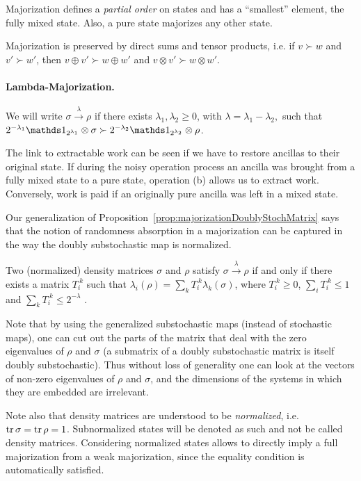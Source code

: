 \documentclass[11pt,a4paper]{article}
\newcommand{\lambdamaj}[1]{\xrightarrow{#1}}
\begin{document}
Majorization defines a {\em partial order} on states and has a ``smallest'' element, the fully mixed state. Also,
a pure state majorizes any other state.

Majorization is preserved by direct sums and tensor products, i.e. if $v\succ w$ and $v'\succ w'$, then
$v\oplus v' \succ w\oplus w'$ and $v\otimes v' \succ w\otimes w'$.

\paragraph{Lambda-Majorization.} We will write $\sigma\lambdamaj{\lambda}\rho$ if there exists
$\lambda_1,\lambda_2\geqslant 0$, with $\lambda=\lambda_1-\lambda_2,$ such
that $2^{-\lambda_1}\Ident_{2^{\lambda_1}}\otimes\sigma \succ 2^{-\lambda_2}\Ident_{2^{\lambda_2}}\otimes\rho$.

The link to extractable work can be seen if we have to restore ancillas to their original state. If during
the noisy operation process an ancilla was brought from a fully mixed state to a pure state, operation (b)
allows us to extract work. Conversely, work is paid if an originally pure ancilla was left in a mixed
state.

Our generalization of Proposition~\ref{prop:majorizationDoublyStochMatrix} says that the notion of
randomness absorption in a majorization can be captured in
the way the doubly substochastic map is normalized.
\begin{prop}
  \label{prop:LambdaMajTik}
  Two (normalized) density matrices $\sigma$ and $\rho$ satisfy $\sigma\lambdamaj{\lambda}\rho$
  if and only if there exists a matrix $T_i^{~k}$ such that $\lambda_i(\rho) = \sum_k T_i^{~k}\lambda_k(\sigma)$,
  where $T_i^{~k}\geqslant 0$, $\sum_i T_i^{~k} \leqslant 1$ and $\sum_k T_i^{~k} \leqslant 2^{-\lambda}$ .
\end{prop}

Note that by using the generalized substochastic maps (instead of stochastic maps), one can cut out the parts
of the matrix that deal with the zero eigenvalues of $\rho$ and $\sigma$ (a submatrix of a doubly substochastic
matrix is itself doubly substochastic). Thus without loss of generality one can look at the vectors of
non-zero eigenvalues of $\rho$ and $\sigma$, and the dimensions of the systems in which they are embedded are
irrelevant.

Note also that density matrices are understood to be {\em normalized}, i.e. $\operatorname{tr}\sigma=\operatorname{tr}\rho=1$. Subnormalized
states will be denoted as such and not be called density matrices. Considering normalized states allows to
directly imply a full majorization from a weak majorization, since the equality condition is automatically
satisfied.
\end{document}
